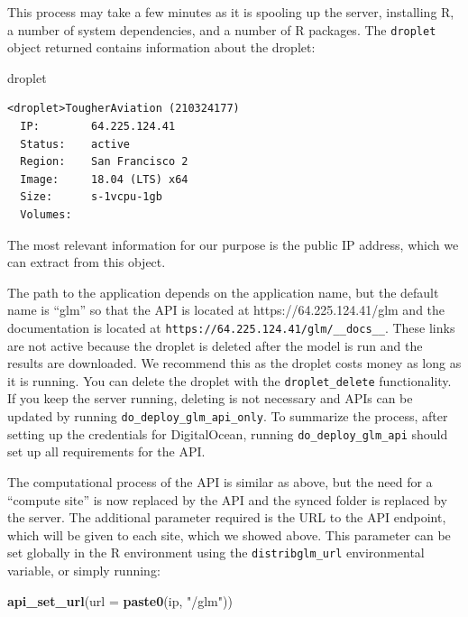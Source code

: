 \documentclass[]{elsarticle} %
\newenvironment{Shaded}{\begin{snugshade}}{\end{snugshade}}
\newcommand{\DataTypeTok}[1]{\textcolor[rgb]{0.13,0.29,0.53}{#1}}
\newcommand{\KeywordTok}[1]{\textcolor[rgb]{0.13,0.29,0.53}{\textbf{#1}}}
\newcommand{\NormalTok}[1]{#1}
\newcommand{\StringTok}[1]{\textcolor[rgb]{0.31,0.60,0.02}{#1}}
\begin{document}
This process may take a few minutes as it is spooling up the server, installing R, a number of system dependencies, and a number of R packages. The \texttt{droplet} object returned contains information about the droplet:

\begin{Shaded}
\begin{Highlighting}[]
\NormalTok{droplet}
\end{Highlighting}
\end{Shaded}

\begin{verbatim}
<droplet>TougherAviation (210324177)
  IP:        64.225.124.41
  Status:    active
  Region:    San Francisco 2
  Image:     18.04 (LTS) x64
  Size:      s-1vcpu-1gb
  Volumes:   
\end{verbatim}

The most relevant information for our purpose is the public IP address, which we can extract from this object.

The path to the application depends on the application name, but the default name is ``glm'' so that the API is located at https://64.225.124.41/glm and the documentation is located at \texttt{https://64.225.124.41/glm/\_\_docs\_\_}. These links are not active because the droplet is deleted after the model is run and the results are downloaded. We recommend this as the droplet costs money as long as it is running. You can delete the droplet with the \texttt{droplet\_delete} functionality. If you keep the server running, deleting is not necessary and APIs can be updated by running \texttt{do\_deploy\_glm\_api\_only}. To summarize the process, after setting up the credentials for DigitalOcean, running \texttt{do\_deploy\_glm\_api} should set up all requirements for the API.

The computational process of the API is similar as above, but the need for a ``compute site'' is now replaced by the API and the synced folder is replaced by the server. The additional parameter required is the URL to the API endpoint, which will be given to each site, which we showed above. This parameter can be set globally in the R environment using the \texttt{distribglm\_url} environmental variable, or simply running:

\begin{Shaded}
\begin{Highlighting}[]
\KeywordTok{api\_set\_url}\NormalTok{(}\DataTypeTok{url =} \KeywordTok{paste0}\NormalTok{(ip, }\StringTok{"/glm"}\NormalTok{))}
\end{Highlighting}
\end{Shaded}
\end{document}
